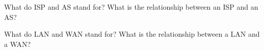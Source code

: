 \begin{exercise}
    What do ISP and AS stand for? What is the relationship between an ISP and an AS?
\end{exercise}

\begin{exercise}
    What do LAN and WAN stand for? What is the relationship between a LAN and a WAN?
\end{exercise}